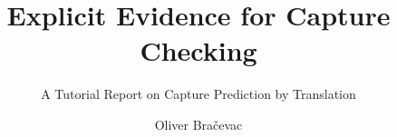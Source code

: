 \documentclass[acmsmall,nonacm,screen]{acmart}
\begin{document}
\title{Explicit Evidence for Capture Checking}
\subtitle{A Tutorial Report on Capture Prediction by Translation}

\author{Oliver Bra\v{c}evac}
\renewcommand{\shortauthors}{Bra\v{c}evac}
\authorsaddresses{}

\begin{abstract}

\end{abstract}

\maketitle

\setcounter{tocdepth}{1}
\tableofcontents



















\end{document}
